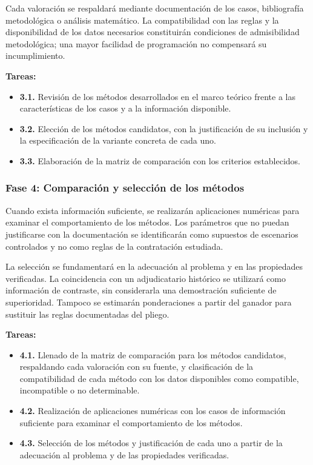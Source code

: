 \documentclass[12pt,a4paper]{article}
\begin{document}
Cada valoración se respaldará mediante documentación de los casos, bibliografía metodológica o análisis matemático. La compatibilidad con las reglas y la disponibilidad de los datos necesarios constituirán condiciones de admisibilidad metodológica; una mayor facilidad de programación no compensará su incumplimiento.

\textbf{Tareas:}

\begin{itemize}
\item \textbf{3.1.} Revisión de los métodos desarrollados en el marco teórico frente a las características de los casos y a la información disponible.
\item \textbf{3.2.} Elección de los métodos candidatos, con la justificación de su inclusión y la especificación de la variante concreta de cada uno.
\item \textbf{3.3.} Elaboración de la matriz de comparación con los criterios establecidos.
\end{itemize}

\subsubsection{Fase 4: Comparación y selección de los métodos}

Cuando exista información suficiente, se realizarán aplicaciones numéricas para examinar el comportamiento de los métodos. Los parámetros que no puedan justificarse con la documentación se identificarán como supuestos de escenarios controlados y no como reglas de la contratación estudiada.

La selección se fundamentará en la adecuación al problema y en las propiedades verificadas. La coincidencia con un adjudicatario histórico se utilizará como información de contraste, sin considerarla una demostración suficiente de superioridad. Tampoco se estimarán ponderaciones a partir del ganador para sustituir las reglas documentadas del pliego.

\textbf{Tareas:}

\begin{itemize}
\item \textbf{4.1.} Llenado de la matriz de comparación para los métodos candidatos, respaldando cada valoración con su fuente, y clasificación de la compatibilidad de cada método con los datos disponibles como compatible, incompatible o no determinable.
\item \textbf{4.2.} Realización de aplicaciones numéricas con los casos de información suficiente para examinar el comportamiento de los métodos.
\item \textbf{4.3.} Selección de los métodos y justificación de cada uno a partir de la adecuación al problema y de las propiedades verificadas.
\end{itemize}
\end{document}

